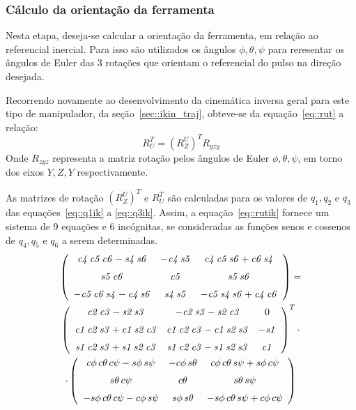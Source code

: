 \subsubsection{Cálculo da orientação da ferramenta}

Nesta etapa, deseja-se calcular a orientação da ferramenta, em relação ao
referencial inercial. Para isso são utilizados os ângulos $\phi,\theta,\psi$
para reresentar os ângulos de Euler das 3 rotações que orientam o referencial do
pulso na direção desejada.

Recorrendo novamente ao desenvolvimento da cinemática inversa geral para este
tipo de manipulador, da seção~\ref{sec::ikin_traj}, obteve-se da
equação~\ref{eq::rut} a relação:
%
\begin{equation*}
	R_{U}^{T} = (R_{Z}^{U})^T R_{yzy}
\end{equation*}
%
Onde $R_{zyz}$ representa a matriz rotação pelos ângulos de Euler
$\phi,\theta,\psi$, em torno dos eixos $Y,Z,Y$ respectivamente.

As matrizes de rotação $(R_{Z}^{U})^T$ e $R_{U}^{T}$ são calculadas para os
valores de $q_1, q_2$ e $q_3$ das equações~\ref{eq::q1ik} a \ref{eq::q3ik}.
Assim, a equação~\ref{eq::rutik} fornece um sistema de 9 equações e 6
incógnitas, se consideradas as funções senos e cossenos de $q_4, q_5$ e $q_6$ a serem
determinadas.
%
\begin{multline} \label{eq::rut}
	 \left( \begin {array}{ccc} {\it c4}\,{\it c5}\,{\it c6}-{\it s4}\,{
\it s6}&-{\it c4}\,{\it s5}&{\it c4}\,{\it c5}\,{\it s6}+{\it c6}\,{
\it s4}\\ \noalign{\medskip}{\it s5}\,{\it c6}&{\it c5}&{\it s5}\,{
\it s6}\\ \noalign{\medskip}-{\it c5}\,{\it c6}\,{\it s4}-{\it c4}\,{
\it s6}&{\it s4}\,{\it s5}&-{\it c5}\,{\it s4}\,{\it s6}+{\it c4}\,{
\it c6}\end {array} \right) = \\
	 \left( \begin {array}{ccc} {\it c2}\,{\it c3}-{\it s2}\,{\it s3}&-{
\it c2}\,{\it s3}-{\it s2}\,{\it c3}&0\\ \noalign{\medskip}{\it c1}\,{
\it c2}\,{\it s3}+{\it c1}\,{\it s2}\,{\it c3}&{\it c1}\,{\it c2}\,{
\it c3}-{\it c1}\,{\it s2}\,{\it s3}&-{\it s1}\\ \noalign{\medskip}{
\it s1}\,{\it c2}\,{\it s3}+{\it s1}\,{\it s2}\,{\it c3}&{\it s1}\,{
\it c2}\,{\it c3}-{\it s1}\,{\it s2}\,{\it s3}&{\it c1}\end {array}
 \right)^T \cdot \\
	\cdot \left( \begin {array}{ccc} c\phi \,c\theta \,c\psi -s\phi \,s\psi &-c
\phi \,s\theta &c\phi \,c\theta \,s\psi +s\phi \,c\psi 
\\ \noalign{\medskip}s\theta \,c\psi &c\theta &s\theta \,s\psi 
\\ \noalign{\medskip}-s\phi \,c\theta \,c\psi -c\phi \,s\psi &s\phi \,
s\theta &-s\phi \,c\theta \,s\psi +c\phi \,c\psi \end {array} \right) 
\end{multline}
%

